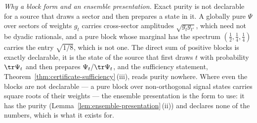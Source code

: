 \begin{remark}
\emph{Why a block form and an ensemble presentation.} Exact purity is not
declarable for a source that draws a sector and then prepares a state in it.
A globally pure $\Psi$ over sectors of weights $g_t$ carries cross-sector
amplitudes $\sqrt{g_tg_{t'}}$, which need not be dyadic rationals, and a
pure block whose marginal has the spectrum $(\tfrac12,\tfrac14,\tfrac14)$
carries the entry $\sqrt{1/8}$, which is not one. The direct sum of positive
blocks is exactly declarable, it is the state of the source that first draws
$t$ with probability $\tr\Psi_t$ and then prepares $\Psi_t/\tr\Psi_t$, and
the sufficiency statement, Theorem~\ref{thm:certificate-sufficiency}\,(iii), reads purity
nowhere. Where even the blocks are not declarable --- a pure block over
non-orthogonal signal states carries square roots of their weights --- the
ensemble presentation is the form to use: it has the purity
(Lemma~\ref{lem:ensemble-presentation}\,(ii)) and declares none of the
numbers, which is what it exists for.
\end{remark}

